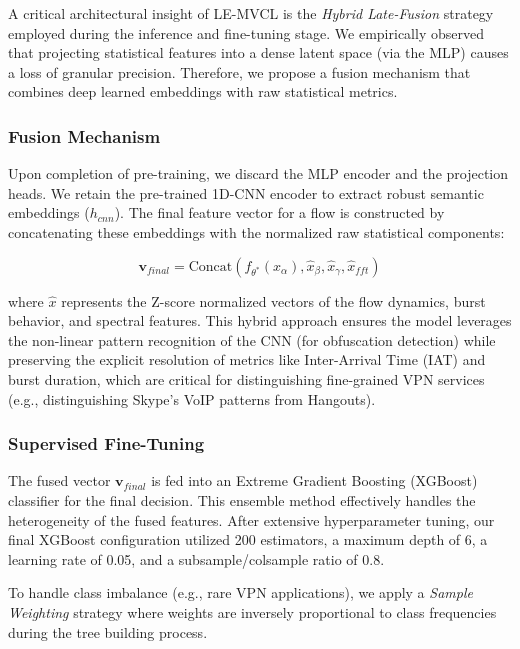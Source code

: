 A critical architectural insight of LE-MVCL is the \textit{Hybrid Late-Fusion} strategy employed during the inference and fine-tuning stage. We empirically observed that projecting statistical features into a dense latent space (via the MLP) causes a loss of granular precision. Therefore, we propose a fusion mechanism that combines deep learned embeddings with raw statistical metrics.

\subsubsection{Fusion Mechanism}
Upon completion of pre-training, we discard the MLP encoder and the projection heads. We retain the pre-trained 1D-CNN encoder to extract robust semantic embeddings ($h_{cnn}$). The final feature vector for a flow is constructed by concatenating these embeddings with the normalized raw statistical components:

\begin{equation}
    \mathbf{v}_{final} = \text{Concat}\left( f_{\theta^*}(x_{\alpha}), \hat{x}_{\beta}, \hat{x}_{\gamma}, \hat{x}_{fft} \right)
\end{equation}

where $\hat{x}$ represents the Z-score normalized vectors of the flow dynamics, burst behavior, and spectral features. This hybrid approach ensures the model leverages the non-linear pattern recognition of the CNN (for obfuscation detection) while preserving the explicit resolution of metrics like Inter-Arrival Time (IAT) and burst duration, which are critical for distinguishing fine-grained VPN services (e.g., distinguishing Skype's VoIP patterns from Hangouts).

\subsubsection{Supervised Fine-Tuning}
The fused vector $\mathbf{v}_{final}$ is fed into an Extreme Gradient Boosting (XGBoost) classifier for the final decision. This ensemble method effectively handles the heterogeneity of the fused features.
After extensive hyperparameter tuning, our final XGBoost configuration utilized 200 estimators, a maximum depth of 6, a learning rate of 0.05, and a subsample/colsample ratio of 0.8.

To handle class imbalance (e.g., rare VPN applications), we apply a \textit{Sample Weighting} strategy where weights are inversely proportional to class frequencies during the tree building process.